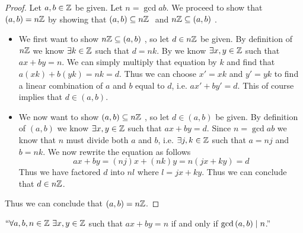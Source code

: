         \begin{proof}
            Let $a, b \in \mathbb{Z}$ be given. Let $n = \gcd{a}{b}$. We proceed to show
            that $(a, b) = n\mathbb{Z}$ by showing that $(a, b) \subseteq n\mathbb{Z} \ $ and 
            $n\mathbb{Z} \subseteq (a, b) \ $.
            \begin{itemize}
                \item
                    We first want to show $n\mathbb{Z} \subseteq (a, b) \ $, so let $d \in n\mathbb{Z}$ be
                    given. By definition of $n\mathbb{Z}$ we know $\exists k \in \mathbb{Z}$ such
                    that $d = nk$. By  we know $\exists
                    x, y \in \mathbb{Z}$ such that $ax + by = n$. We can simply multiply that
                    equation by $k$ and find that $a(xk) + b(yk) = nk = d$. Thus we can choose
                    $x' = xk$ and $y' = yk$ to find a linear combination of $a$ and $b$ equal to
                    $d$, i.e. $ax' + by' = d$. This of course implies that $d \in (a, b)$.
                \item
                    We now want to show $(a, b) \subseteq n\mathbb{Z} \ $, so let $d \in (a, b)$
                    be given. By definition of $(a, b)$ we know $\exists x, y \in \mathbb{Z}$
                    such that $ax + by = d$. Since $n = \gcd{a}{b}$ we know that $n$ must
                    divide both $a$ and $b$, i.e. $\exists j, k \in \mathbb{Z}$ such that
                    $a = nj$ and $b = nk$. We now rewrite the equation as follows
                    \[
                        ax + by = (nj)x + (nk)y = n(jx + ky) = d
                    \]
                    Thus we have factored $d$ into $nl$ where $l = jx + ky$. Thus we can conclude
                    that $d \in n\mathbb{Z}$.
            \end{itemize}
            Thus we can conclude that $(a, b) = n\mathbb{Z}$. \QED
        \end{proof}
        \begin{corollary}
            $``\forall a, b, n \in \mathbb{Z} \ \exists x, y \in \mathbb{Z}$ such that
            $ax + by = n$ if and only if $\mathrm{gcd}\left(a, b\right) \mid n$.''
            \label{ax + by = n <==> gcd(a, b) | n}
        \end{corollary}
